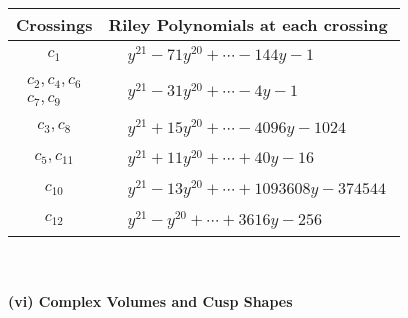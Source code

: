 \documentclass[1p]{elsarticle_modified}
\theoremstyle{definition}
\begin{document}
\begin{tabular}{m{50pt}|m{274pt}}
Crossings & \hspace{64pt}Riley Polynomials at each crossing \\
\hline $$\begin{aligned}c_{1}\end{aligned}$$&$\begin{aligned}
&y^{21}-71 y^{20}+\cdots-144 y-1
\end{aligned}$\\
\hline $$\begin{aligned}c_{2},c_{4},c_{6}\\c_{7},c_{9}\end{aligned}$$&$\begin{aligned}
&y^{21}-31 y^{20}+\cdots-4 y-1
\end{aligned}$\\
\hline $$\begin{aligned}c_{3},c_{8}\end{aligned}$$&$\begin{aligned}
&y^{21}+15 y^{20}+\cdots-4096 y-1024
\end{aligned}$\\
\hline $$\begin{aligned}c_{5},c_{11}\end{aligned}$$&$\begin{aligned}
&y^{21}+11 y^{20}+\cdots+40 y-16
\end{aligned}$\\
\hline $$\begin{aligned}c_{10}\end{aligned}$$&$\begin{aligned}
&y^{21}-13 y^{20}+\cdots+1093608 y-374544
\end{aligned}$\\
\hline $$\begin{aligned}c_{12}\end{aligned}$$&$\begin{aligned}
&y^{21}- y^{20}+\cdots+3616 y-256
\end{aligned}$\\
\hline
\end{tabular}\\~\\
\newpage\flushleft \textbf{(vi) Complex Volumes and Cusp Shapes}
\end{document}
